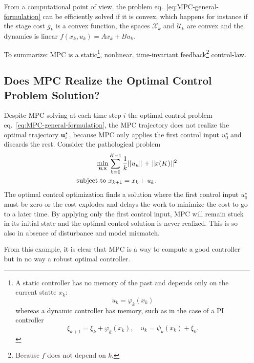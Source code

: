 From a computational point of view, the problem eq.~\eqref{eq:MPC-general-formulation} can be efficiently solved if it is convex, which happens for instance if the stage cost $g_k$ is a convex function, the spaces $\mathcal{X}_k$ and $\mathcal{U}_k$ are convex and the dynamics is linear $f(x_k,u_k)=Ax_k+Bu_k$.


To summarize: MPC is a static\footnote{A static controller has no memory of the past and depends only on the current statte $x_k$:
  \begin{equation*}
    u_k = \varphi_k(x_k)
  \end{equation*}
  whereas a dynamic controller has memory, such as in the case of a
  PI controller
  \begin{equation*}
    \xi_{k+1} = \xi_k + \varphi_k(x_k),\quad u_k = \psi_k(x_k) + \xi_k.
  \end{equation*}}, nonlinear, time-invariant feedback\footnote{Because $f$ does not depend on $k$.} control-law.


\subsection{Does MPC Realize the Optimal Control Problem Solution?}
\label{sec:MPC-not-an-optimal-control-solver}

Despite MPC solving at each time step $i$ the optimal control problem eq.~\eqref{eq:MPC-general-formulation}, the MPC trajectory does not realize the optimal trajectory $\boldsymbol{\mathrm{u}}_i^\star$, because MPC only applies the first control input $u_0^\star$ and discards the rest. Consider the pathological problem
\begin{align*}
  \min_{\boldsymbol{\mathrm{u}},\boldsymbol{\mathrm{x}}} & \sum_{k=0}^{K-1}\frac {1}{k}||u_u|| + ||x(K)||^2\\
  \text{subject to } &x_{k+1} = x_k+u_k.
\end{align*}
The optimal control optimization finds a solution where the first control input $u_0^\star$ must be zero or the cost explodes and delays the work to minimize the cost to go to a later time. By applying only the first control input, MPC will remain stuck in its initial state and the optimal control solution is never realized. This is so also in absence of disturbance and model mismatch.

From this example, it is clear that MPC is a way to compute a good controller but in no way a robust optimal controller.

